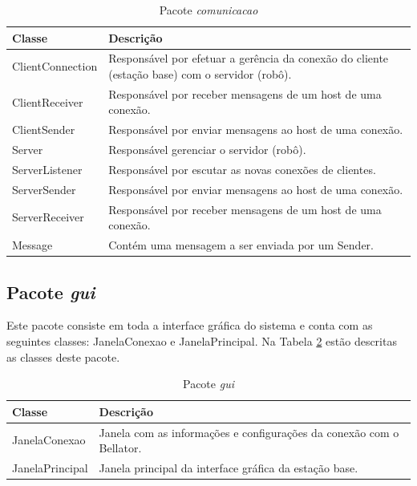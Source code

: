 \begin{table}[h]
  \centering
  \caption{Pacote \textit{comunicacao}}
    \begin{tabular}{p{6cm}p{8cm}}
    \toprule
    \textbf{Classe} & \textbf{Descrição} \\ 
    \midrule
    ClientConnection & Responsável por efetuar a gerência da conexão do cliente (estação base) com o servidor (robô). \\ \hline
    ClientReceiver & Responsável por receber mensagens de um host de uma conexão. \\ \hline
    ClientSender & Responsável por enviar mensagens ao host de uma conexão. \\ \hline
    Server & Responsável gerenciar o servidor (robô). \\ \hline
    ServerListener & Responsável por escutar as novas conexões de clientes. \\ \hline
    ServerSender & Responsável por enviar mensagens ao host de uma conexão. \\ \hline
    ServerReceiver & Responsável por receber mensagens de um host de uma conexão. \\ \hline
    Message & Contém uma mensagem a ser enviada por um Sender. \\ 
    \bottomrule
    \end{tabular}%
  \label{tab:pacote_comunicacao}%
\end{table}%

\subsection{Pacote \textit{gui}}

Este pacote consiste em toda a interface gráfica do sistema e conta com as seguintes classes: JanelaConexao e JanelaPrincipal. Na Tabela \ref{tab:pacote_interface_grafica} estão descritas as classes deste pacote.

\begin{table}[h]
  \centering
  \caption{Pacote \textit{gui}}
    \begin{tabular}{p{6cm}p{8cm}}
    \toprule
    \textbf{Classe} & \textbf{Descrição} \\ 
    \midrule
    JanelaConexao & Janela com as informações e configurações da conexão com o Bellator. \\ \hline
    JanelaPrincipal & Janela principal da interface gráfica da estação base. \\ 
    \bottomrule
    \end{tabular}%
  \label{tab:pacote_interface_grafica}%
\end{table}%

